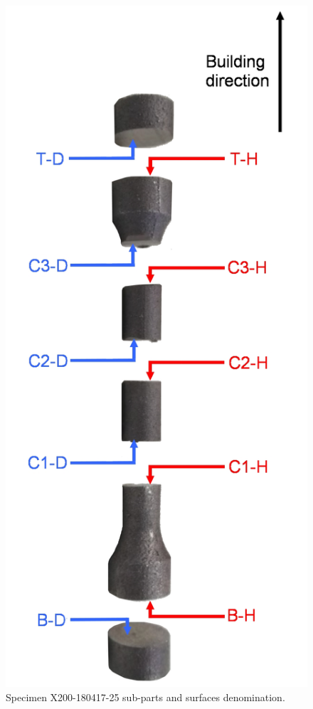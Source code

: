 \begin{figure}[ht]
\centering
\centerline{\includegraphics[scale=0.23]{Images/Saus}}
\decoRule
\caption[Specimen X200-180417-25 sub-parts and surfaces denomination]{Specimen X200-180417-25 sub-parts and surfaces denomination.}
\label{fig:saus}
\end{figure}

